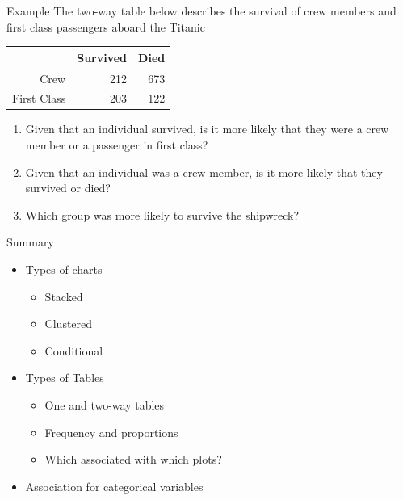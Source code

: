 \documentclass{beamer}
\begin{document}
\begin{frame}{Example}
The two-way table below describes the survival of crew members and first class passengers aboard the Titanic

\begin{table}[ht]
\centering
\begin{tabular}{rrr}
  \hline
 & Survived & Died \\ 
  \hline
Crew & 212 & 673 \\ 
  First Class & 203 & 122 \\ 
   \hline
\end{tabular}
\end{table}

\begin{enumerate}
	\item Given that an individual survived, is it more likely that they were a crew member or a passenger in first class?
	\item Given that an individual was a crew member, is it more likely that they survived or died?
	\item Which group was more likely to survive the shipwreck?
\end{enumerate}
\end{frame}


\begin{frame}{Summary}

\begin{itemize}
\item Types of charts
\begin{itemize}
\item Stacked
\item Clustered
\item Conditional
\end{itemize}
\item Types of Tables
\begin{itemize}
\item One and two-way tables
\item Frequency and proportions
\item Which associated with which plots?
\end{itemize}
\item Association for categorical variables
\end{itemize}


\end{frame}



%
%
\end{document}
